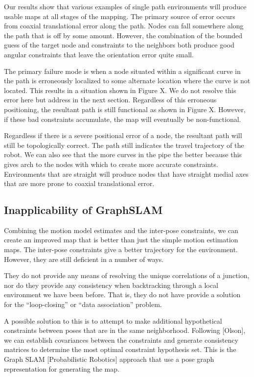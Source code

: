 Our results show that various examples of single path environments will produce usable maps at all stages of the mapping. The primary source of error occurs from coaxial translational error along the path. Nodes can fall somewhere along the path that is off by some amount. However, the combination of the bounded guess of the target node and constraints to the neighbors both produce good angular constraints that leave the orientation error quite small.

The primary failure mode is when a node situated within a significant curve in the path is erroneously localized to some alternate location where the curve is not located. This results in a situation shown in Figure X. We do not resolve this error here but address in the next section. Regardless of this erroneous positioning, the resultant path is still functional as shown in Figure X. However, if these bad constraints accumulate, the map will eventually be non-functional.

Regardless if there is a severe positional error of a node, the resultant path will still be topologically correct. The path still indicates the travel trajectory of the robot. We can also see that the more curves in the pipe the better because this gives arch to the nodes with which to create more accurate constraints. Environments that are straight will produce nodes that have straight medial axes that are more prone to coaxial translational error.

\subsection{Inapplicability of GraphSLAM}
\label{inapplicabilityofgraphslam}

Combining the motion model estimates and the inter-pose constraints, we can create an improved map that is better than just the simple motion estimation maps. The inter-pose constraints give a better trajectory for the environment. However, they are still deficient in a number of ways.

They do not provide any means of resolving the unique correlations of a junction, nor do they provide any consistency when backtracking through a local environment we have been before. That is, they do not have provide a solution for the “loop-closing” or “data association” problem.

A possible solution to this is to attempt to make additional hypothetical constraints between poses that are in the same neighborhood. Following [Olson], we can establish covariances between the constraints and generate consistency matrices to determine the most optimal constraint hypothesis set. This is the Graph SLAM [Probabilistic Robotics] approach that use a pose graph representation for generating the map.


